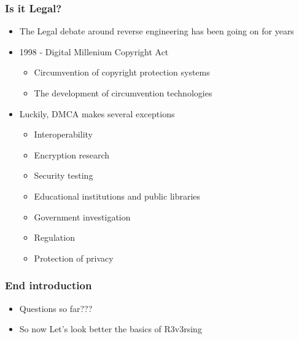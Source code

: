 \documentclass[]{beamer}
\begin{document}
		\begin{frame}
			\frametitle{Is it Legal?}
			\begin{itemize}
				\item{The Legal debate around reverse engineering has been going on for years}
				\item{1998 -  Digital Millenium Copyright Act}
					\begin{itemize}
						\item{Circumvention of copyright protection systems}
						\item{The development of circumvention technologies}
					\end{itemize}
				\item{Luckily, DMCA makes several exceptions}
					\begin{itemize}
						\item{Interoperability}
						\item{Encryption research}
						\item{Security testing}
						\item{Educational institutions and public libraries}
						\item{Government investigation}
						\item{Regulation}
						\item{Protection of privacy}
					\end{itemize}
			\end{itemize}
		\end{frame}
		\begin{frame}
			\frametitle{End introduction}
			\begin{itemize}
				\item{Questions so far???}
				\item{So now Let's look better the basics of R3v3rsing}
			\end{itemize}
		\end{frame}

\end{document}
